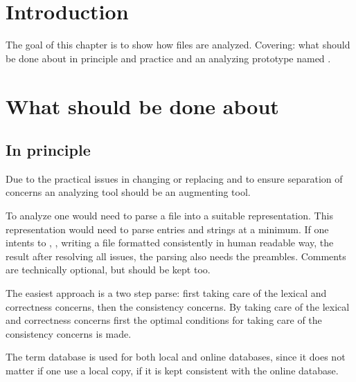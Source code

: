 \section{Introduction}

The goal of this chapter is to show how {\bibtex} files are analyzed.
Covering: what should be done about {\bibtex} in principle and
practice  and an analyzing prototype
named {\orangutan} .


\section{What should be done about {\bibtex}}
\label{sec:analyzing_what_to_do}
\subsection{In principle}

Due to the practical issues in changing or replacing {\bibtex} and to
ensure separation of concerns an analyzing tool should be an
augmenting tool.

To analyze {\bibtex} one would need to parse a {\bibtex} file into a
suitable representation.  This representation would need to parse
{\bibtex} entries and strings at a minimum.  If one intents to
, \ie, writing a {\bibtex} file formatted
consistently in human readable way, the result after resolving all
issues, the parsing also needs the preambles.  Comments are
technically optional, but should be kept too.

The easiest approach is a two step parse: first taking care of the
lexical and correctness concerns, then the consistency concerns.  By
taking care of the lexical and correctness concerns first the optimal
conditions for taking care of the consistency concerns is made.

The term database is used for both local and online databases, since
it does not matter if one use a local copy, if it is kept consistent
with the online database.

